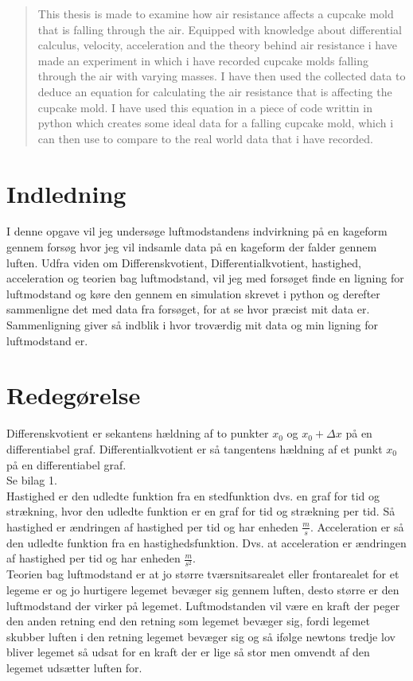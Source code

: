 \documentclass[12pt]{article}
\begin{document}
\begin{abstract}
This thesis is made to examine how air resistance affects a cupcake mold that is falling
through the air. Equipped with knowledge about differential calculus, velocity, acceleration
and the theory behind air resistance i have made an experiment in which i have recorded
cupcake molds falling through the air with varying masses. I have then used the collected
data to deduce an equation for calculating the air resistance that is affecting the cupcake
mold. I have used this equation in a piece of code writtin in python which creates some
ideal data for a falling cupcake mold, which i can then use to compare to the real world
data that i have recorded.
\end{abstract}
\pagebreak

\tableofcontents
\pagebreak

\section{Indledning}
I denne opgave vil jeg undersøge luftmodstandens indvirkning på en kageform gennem forsøg
hvor jeg vil indsamle data på en kageform der falder gennem luften. Udfra viden om
Differenskvotient, Differentialkvotient, hastighed, acceleration og teorien bag
luftmodstand, vil jeg med forsøget finde en ligning for luftmodstand og køre den
gennem en simulation skrevet i python og derefter sammenligne det med data fra forsøget,
for at se hvor præcist mit data er. Sammenligning giver så indblik i hvor troværdig mit data
og min ligning for luftmodstand er.

\section{Redegørelse}
Differenskvotient er sekantens hældning af to punkter $x_{0}$ og $x_{0}+\Delta x$ på en differentiabel graf.
Differentialkvotient er så tangentens hældning af et punkt $x_{0}$ på en differentiabel graf.\\
Se bilag 1.\\
Hastighed er den udledte funktion fra en stedfunktion dvs. en graf for tid og strækning, hvor den udledte funktion er en graf for tid og strækning per tid. Så hastighed er ændringen af hastighed per tid og har enheden $\frac{m}{s}$.
Acceleration er så den udledte funktion fra en hastighedsfunktion. Dvs. at acceleration er ændringen af hastighed per tid og har enheden $\frac{m}{s^2}$.\\
Teorien bag luftmodstand er at jo større tværsnitsarealet eller frontarealet for et legeme er og jo hurtigere legemet bevæger sig gennem luften, desto større er den luftmodstand der virker på legemet. Luftmodstanden vil være en kraft der peger den anden retning end den retning som legemet bevæger sig,
fordi legemet skubber luften i den retning legemet bevæger sig og så ifølge newtons tredje lov bliver legemet så udsat for en kraft der er lige så stor men omvendt af den legemet udsætter luften for.
\end{document}
